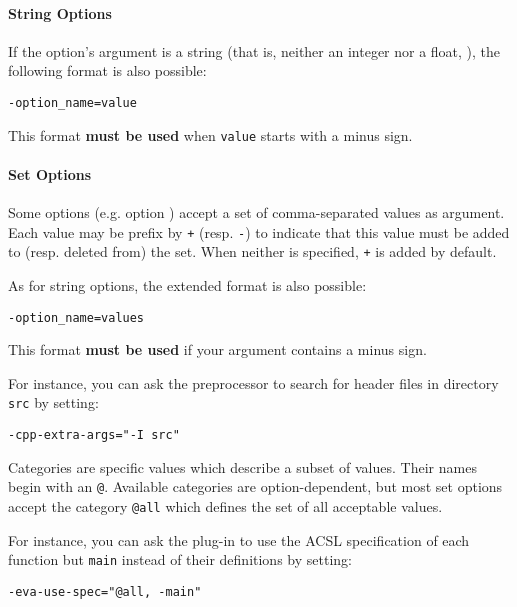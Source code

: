 \paragraph{String Options}

If the option's argument is a
string (that is, neither an integer nor a float, \etc), the following
format is also possible:
\begin{commands}
\texttt{-option\_name=value}
\end{commands}

\begin{important}
This format \textbf{must be used} when \texttt{value} starts with a minus sign.
\end{important}

\paragraph{Set Options}

Some options (e.g. option ) accept a set of
comma-separated values as argument. Each value may be prefix by \texttt{+}
(resp. \texttt{-}) to indicate that this value must be added to (resp. deleted
from) the set. When neither is specified, \texttt{+} is added by default.

As for string options, the extended format is also possible:
\begin{commands}
\texttt{-option\_name=values}
\end{commands}

\begin{important}
This format \textbf{must be used} if your argument contains a minus sign.
\end{important}

For instance, you can ask the \C preprocessor to search for header files in
directory \texttt{src} by setting:
\begin{commands}
\texttt{-cpp-extra-args="-I src"}
\end{commands}

Categories are specific values which describe a subset of values. Their names
begin with an \texttt{@}. Available categories are option-dependent, but most
set options accept the category \texttt{@all} which defines the set of all
acceptable values.

For instance, you can ask the \Value plug-in to use the ACSL specification of
each function but \texttt{main} instead of their definitions by setting:
\begin{commands}
\texttt{-eva-use-spec="@all, -main"}
\end{commands}

